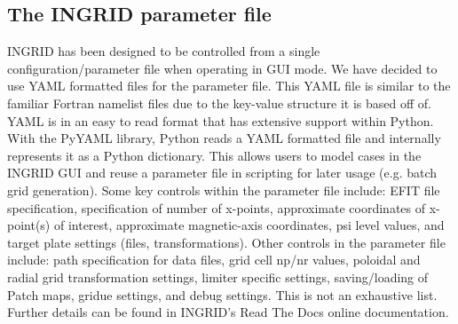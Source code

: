 \subsection{\label{sec:level2}The INGRID parameter file}
INGRID has been designed to be controlled from a single configuration/parameter file when operating in GUI mode. We have decided to use YAML formatted files for the parameter file\cite{PyYAML}. This YAML file is similar to the familiar Fortran namelist files due to the key-value structure it is based off of. YAML is in an easy to read format that has extensive support within Python. With the PyYAML library, Python reads a YAML formatted file and internally represents it as a Python dictionary. This allows users to model cases in the INGRID GUI and reuse a parameter file in scripting for later usage (e.g. batch grid generation). Some key controls within the parameter file include: EFIT file specification, specification of number of x-points, approximate coordinates of x-point(s) of interest, approximate magnetic-axis coordinates, psi level values, and target plate settings (files, transformations). Other controls in the parameter file include: path specification for data files, grid cell np/nr values, poloidal and radial grid transformation settings, limiter specific settings, saving/loading of Patch maps, gridue settings, and debug settings. This is not an exhaustive list. Further details can be found in INGRID's Read The Docs online documentation.